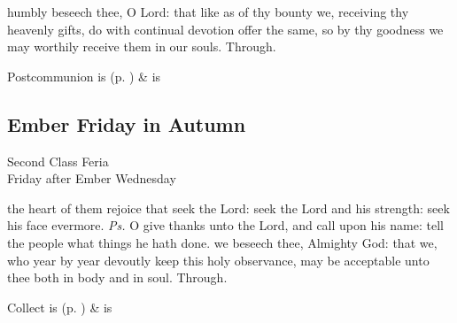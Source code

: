 \postcommunion
{} humbly beseech thee, O Lord: that like as of thy bounty we, receiving thy heavenly gifts, do with continual devotion offer the same, so by thy goodness we may worthily receive them in our souls. Through.
\begin{rubric}
     Postcommunion is  (p. \pageref{SPSaints}) \&  is 
\end{rubric}


\subsection{Ember Friday in Autumn}
\begin{inhead}
    {Second Class Feria\\
Friday after Ember Wednesday}
\end{inhead}
\par\noindent
\introit
{} the heart of them rejoice that seek the Lord: seek the Lord and his strength: seek his face evermore. \textit{Ps.} O give thanks unto the Lord, and call upon his name: tell the people what things he hath done.
\collect
{} we beseech thee, Almighty God: that we, who year by year devoutly keep this holy observance, may be acceptable unto thee both in body and in soul. Through.
\begin{rubric}
     Collect is  (p. \pageref{SPSaints}) \&  is 
\end{rubric}

